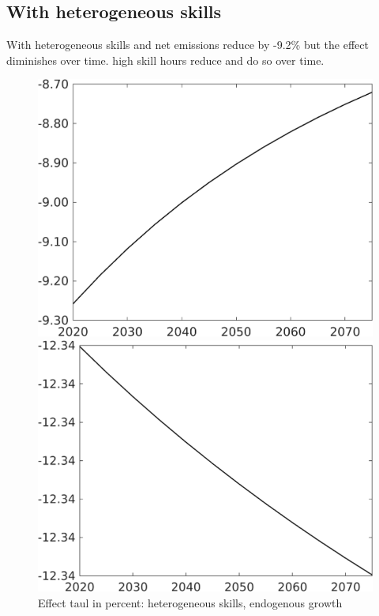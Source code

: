 \documentclass[12pt]{article}
\begin{document}
\subsection{With heterogeneous skills}
With heterogeneous skills and net emissions reduce by -9.2\% but the effect diminishes over time. high skill hours reduce and do so over time. 
\begin{figure}[h!!]
	\centering
	\caption{Effect taul in percent: heterogeneous skills, endogenous growth}\label{fig:LF_BAU_nsk0_xgr0}
	\begin{minipage}[]{0.32\textwidth}
		\includegraphics[width=1\textwidth]{../../codding_model/own_basedOnFried/optimalPol_010922_revision/figures/all_13Sept22/CompTaul_LFBAUPer_Reg0_Emnet_spillover0_nsk0_xgr0_knspil0_sep1_countec0_GovRev0_etaa0.79.png}
	\end{minipage}	
	\begin{minipage}[]{0.32\textwidth}
		\includegraphics[width=1\textwidth]{../../codding_model/own_basedOnFried/optimalPol_010922_revision/figures/all_13Sept22/CompTaul_LFBAUPer_Reg0_hh_spillover0_nsk0_xgr0_knspil0_sep1_countec0_GovRev0_etaa0.79.png}

\end{minipage}
\end{figure}
\end{document}
